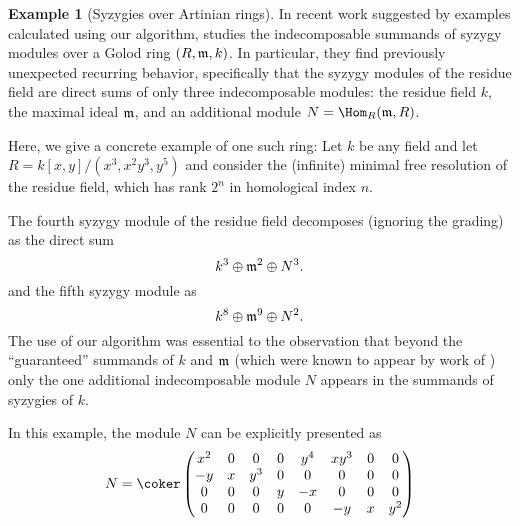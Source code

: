 \documentclass[12pt]{article}
\theoremstyle{theorem}
\numberwithin{thm}{section}
\theoremstyle{definition}
\newtheorem{exa}[thm]{Example}
\newcommand{\mahrud}[1]{{\color{ForestGreen} \sf $\blacklozenge$ Mahrud: [#1]}}
\begin{document}
\begin{exa}[Syzygies over Artinian rings]
  In recent work suggested by examples calculated using our algorithm, \cite{CDE24} studies the indecomposable summands of syzygy modules over a Golod ring $(R,\mathfrak m,k)$. In particular, they find previously unexpected recurring behavior, specifically that the syzygy modules of the residue field are direct sums of only three indecomposable modules: the residue field $k$, the maximal ideal $\mathfrak m$, and an additional module $N = \Hom_R(\m, R)$.

  Here, we give a concrete example of one such ring:
  Let $k$ be any field and let
  $R = k[x,y]/(x^3,x^2y^3,y^5)$ and consider the (infinite) minimal free resolution of the residue field, which has rank $2^n$ in homological index $n$.

  The fourth syzygy module of the residue field decomposes (ignoring the grading) as the direct sum
  $$ k^3 \oplus \mathfrak m^2 \oplus N^3. $$
  and the fifth syzygy module as
  $$ k^8\oplus \mathfrak m^9 \oplus N^2. $$
  The use of our algorithm was essential to the observation that beyond the ``guaranteed'' summands of $k$ and $\mathfrak m$ (which were known to appear by work of \cite{DE23}) only the one additional indecomposable module $N$ appears in the summands of syzygies of $k$.

  In this example, the module $N$ can be explicitly presented as
  $$N=\coker
  \begin{pmatrix}
    x^{2}&0&0&0&y^{4}&xy^{3}&0&0\\
    -y&x&y^{3}&0&0&0&0&0\\
    0&0&0&y&-x&0&0&0\\
    0&0&0&0&0&-y&x&y^{2}
  \end{pmatrix}
  $$

\end{exa}

\end{document}
